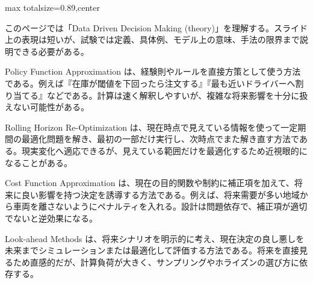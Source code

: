 \begin{minipage}[t]{0.58\textwidth}
\begin{adjustbox}{max totalsize={\textwidth}{0.89\textheight},center}
\begin{minipage}{\textwidth}\scriptsize
{}このページでは「Data Driven Decision Making (theory)」を理解する。スライド上の表現は短いが、試験では定義、具体例、モデル上の意味、手法の限界まで説明できる必要がある。\par
Policy Function Approximation は、経験則やルールを直接方策として使う方法である。例えば『在庫が閾値を下回ったら注文する』『最も近いドライバーへ割り当てる』などである。計算は速く解釈しやすいが、複雑な将来影響を十分に扱えない可能性がある。\par
Rolling Horizon Re-Optimization は、現在時点で見えている情報を使って一定期間の最適化問題を解き、最初の一部だけ実行し、次時点でまた解き直す方法である。現実変化へ適応できるが、見えている範囲だけを最適化するため近視眼的になることがある。\par
Cost Function Approximation は、現在の目的関数や制約に補正項を加えて、将来に良い影響を持つ決定を誘導する方法である。例えば、将来需要が多い地域から車両を離さないようにペナルティを入れる。設計は問題依存で、補正項が適切でないと逆効果になる。\par
Look-ahead Methods は、将来シナリオを明示的に考え、現在決定の良し悪しを未来までシミュレーションまたは最適化して評価する方法である。将来を直接見るため直感的だが、計算負荷が大きく、サンプリングやホライズンの選び方に依存する。\par

\end{minipage}
\end{adjustbox}
\end{minipage}
